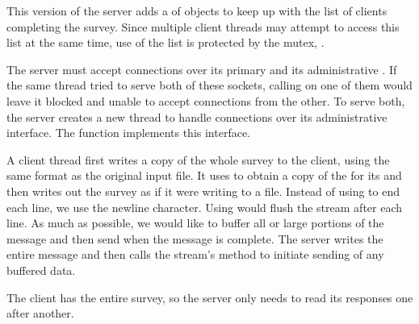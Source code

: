 \begin{topcode}



This version of the server adds a  of
 objects to keep up with the list of clients
completing the survey.  Since multiple client threads may attempt to
access this list at the same time, use of the list is protected
by the mutex, .



The server must accept connections over its primary
 and its administrative
.  If the same thread tried to serve both of
these sockets, calling  on one of them would leave it
blocked and unable to accept connections from the other.  To serve
both, the server creates a new thread to handle connections over its
administrative interface.  The  function
implements this interface.



\begin{bottomcode}


A client thread first writes a copy of the whole survey to the client,
using the same format as the original input file.  It uses
 to obtain a copy of the  for its
 and then writes out the survey as if it were writing
to a file.  Instead of using  to end each line, we use the
newline character.  Using  would flush the stream after each
line.  As much as possible, we would like to buffer all or large portions of
the message and then send when the message is complete.  The server writes
the entire message and then calls the stream's  method
to initiate sending of any buffered data.


The client has the entire survey, so the server only needs to read its
responses one after another.


\end{bottomcode}
\end{topcode}
